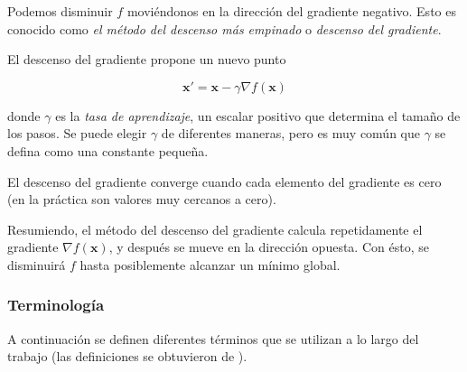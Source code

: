 \begin{remark}
Podemos disminuir $f$
moviéndonos en la dirección del gradiente negativo. Esto es conocido
como \textit{el método del descenso más empinado} o \textit{descenso del gradiente}.

El descenso del gradiente propone un nuevo punto

\[
\mathbf{x}' = \mathbf{x} - \gamma \nabla f(\mathbf{x})
\]


donde $\gamma$ es la \textit{tasa de aprendizaje}, un escalar positivo
que determina el tamaño de los pasos. Se puede elegir $\gamma$
de diferentes maneras, pero es muy común que $\gamma$
se defina como una constante pequeña.
\end{remark}

El descenso del gradiente converge cuando cada elemento del gradiente es 
cero (en la práctica son valores muy cercanos a cero).

Resumiendo, el método del descenso del gradiente
calcula repetidamente el gradiente $\nabla f(\mathbf{x})$,
y después se mueve en la dirección opuesta. Con ésto, se disminuirá $f$ hasta 
posiblemente alcanzar un mínimo global.

\subsubsection{Terminología}

A continuación se definen diferentes términos que se utilizan a lo
largo del trabajo (las definiciones se obtuvieron de \cite{mehryarmohriafshinrostamizadehameettalwalkar2012}).

